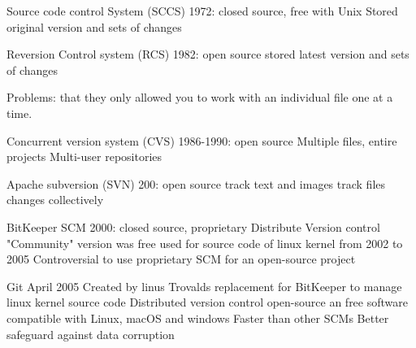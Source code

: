 Source code control System (SCCS)
  1972: closed source, free with Unix 
  Stored original version and sets of changes 

Reversion Control system (RCS)
  1982: open source 
  stored latest version and sets of changes 

Problems:
  that they only allowed you to work with an individual file one at a time.

Concurrent version system (CVS)
  1986-1990: open source 
  Multiple files, entire projects
  Multi-user repositories

Apache subversion (SVN)
  200: open source 
  track text and images 
  track files changes collectively 

BitKeeper SCM 
  2000: closed source, proprietary 
  Distribute Version control 
  "Community" version was free
  used for source code of linux kernel from 2002 to 2005
  Controversial to use proprietary SCM for an open-source project 

Git 
  April 2005 
  Created by linus Trovalds
  replacement for BitKeeper to manage linux kernel source code 
  Distributed version control 
  open-source an free software 
  compatible with Linux, macOS and windows
  Faster than other SCMs 
  Better safeguard against data corruption 